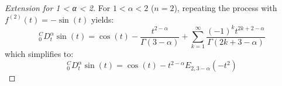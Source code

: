 \documentclass{article}
\begin{document}
\begin{proof}[Extension for 1 < α < 2]
For $1 < \alpha < 2$ ($n=2$), repeating the process with $f^{(2)}(t) = -\sin(t)$ yields:
\begin{equation}
_0^CD_t^\alpha \sin(t) = \cos(t) - \frac{t^{2-\alpha}}{\Gamma(3-\alpha)} + \sum_{k=1}^{\infty} \frac{(-1)^k t^{2k+2-\alpha}}{\Gamma(2k+3-\alpha)}
\end{equation}
which simplifies to:
\begin{equation}
_0^CD_t^\alpha \sin(t) = \cos(t) - t^{2-\alpha} E_{2,3-\alpha}(-t^2)
\end{equation}
\end{proof}
\end{document}
